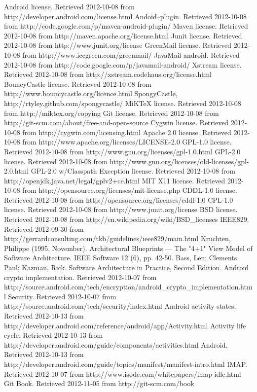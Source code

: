 \documentclass[12pt]{report}
\begin{document}
\begin{thebibliography}{99}
 Android license. Retrieved 2012-10-08 from http://developer.android.com/license.html
 Andoid--plugin. Retrieved 2012-10-08 from http://code.google.com/p/maven-android-plugin/
 Maven license. Retrieved 2012-10-08 from http://maven.apache.org/license.html
 Junit license. Retrieved 2012-10-08 from http://www.junit.org/license
 GreenMail license. Retrieved 2012-10-08 from http://www.icegreen.com/greenmail/
 JavaMail-android. Retrieved 2012-10-08 from http://code.google.com/p/javamail-android/
 Xstream license. Retrieved 2012-10-08 from http://xstream.codehaus.org/license.html
 BouncyCastle license. Retrieved 2012-10-08 from http://www.bouncycastle.org/licence.html
 SpongyCastle, http://rtyley.github.com/spongycastle/
 MiKTeX license. Retrieved 2012-10-08 from http://miktex.org/copying
 Git license. Retrieved 2012-10-08 from http://git-scm.com/about/free-and-open-source
 Cygwin license. Retrieved 2012-10-08 from http://cygwin.com/licensing.html
 Apache 2.0 license. Retrieved 2012-10-08 from http://www.apache.org/licenses/LICENSE-2.0
 GPL-1.0 license. Retrieved 2012-10-08 from http://www.gnu.org/licenses/gpl-1.0.html
 GPL-2.0 license. Retrieved 2012-10-08 from http://www.gnu.org/licenses/old-licenses/gpl-2.0.html
 GPL-2.0 w/Classpath Exception license. Retrieved 2012-10-08 from http://openjdk.java.net/legal/gplv2+ce.html
 MIT X11 license. Retrieved 2012-10-08 from http://opensource.org/licenses/mit-license.php
 CDDL-1.0 license. Retrieved 2012-10-08 from http://opensource.org/licenses/cddl-1.0
 CPL-1.0 license. Retrieved 2012-10-08 from http://www.junit.org/license
 BSD license. Retrieved 2012-10-08 from http://en.wikipedia.org/wiki/BSD\_licenses
 IEEE829. Retrieved  2012-09-30 from http://gerrardconsulting.com/tkb/guidelines/ieee829/main.html
 Kruchten, Philippe (1995, November). Architectural Blueprints — The "4+1" View Model of Software Architecture. IEEE Software 12 (6), pp. 42-50.
 Bass, Len; Clements, Paul; Kazman, Rick. Software Architecture in Practice, Second Edition.
 Android crypto implementation. Retrieved 2012-10-07 from http://source.android.com/tech/encryption/android\_crypto\_implementation.html
 Security. Retrieved 2012-10-07 from http://source.android.com/tech/security/index.html
 Android activity states. Retrieved 2012-10-13 from http://developer.android.com/reference/android/app/Activity.html
 Activity life cycle. Retrieved 2012-10-13 from http://developer.android.com/guide/components/activities.html
 Android. Retrieved 2012-10-13 from http://developer.android.com/guide/topics/manifest/manifest-intro.html
 IMAP. Retrieved 2012-10-07 from http://www.isode.com/whitepapers/imap-idle.html
 Git Book. Retrieved 2012-11-05 from http://git-scm.com/book


\end{thebibliography}
\end{document}
